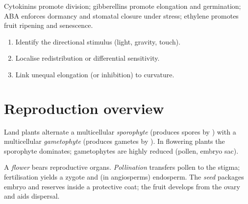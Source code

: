 \begin{example}
\label{ex:g12:plant-biology:others}
Cytokinins promote  division; gibberellins promote  elongation
and  germination; ABA enforces dormancy and stomatal closure under
stress; ethylene promotes fruit ripening and senescence.
\end{example}

\begin{method}\label{met:g12:plant-biology:tropism}
\begin{enumerate}
  \item Identify the directional stimulus (light, gravity, touch).
  \item Localise  redistribution or differential sensitivity.
  \item Link unequal elongation (or  inhibition) to curvature.
\end{enumerate}
\end{method}

\section{Reproduction overview}

\begin{definition}
\label{def:g12:plant-biology:alternation}
Land plants alternate a multicellular  \emph{sporophyte}
 (produces spores by ) with a multicellular
 \emph{gametophyte} (produces gametes by
). In flowering plants the sporophyte dominates; gametophytes are
highly reduced (pollen, embryo sac).
\end{definition}

\begin{definition}
\label{def:g12:plant-biology:flower}
A \emph{flower} bears reproductive organs. \emph{Pollination}
 transfers pollen to the stigma; fertilisation yields
a zygote and (in angiosperms) endosperm. The \emph{seed}
packages embryo and reserves inside a protective coat; the fruit develops
from the ovary and aids dispersal.
\end{definition}


